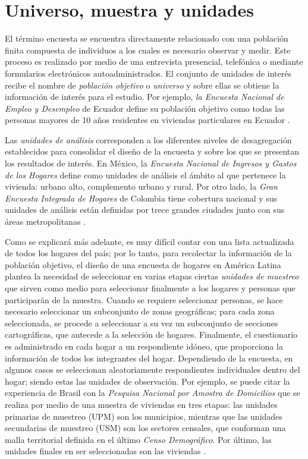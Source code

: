 \documentclass[
  12pt,
]{book}
\begin{document}
\hypertarget{universo-muestra-y-unidades}{%
\section{Universo, muestra y unidades}\label{universo-muestra-y-unidades}}

El término encuesta se encuentra directamente relacionado con una población finita compuesta de individuos a los cuales es necesario observar y medir. Este proceso es realizado por medio de una entrevista presencial, telefónica o mediante formularios electrónicos autoadministrados. El conjunto de unidades de interés recibe el nombre de \emph{población objetivo} o \emph{universo} y sobre ellas se obtiene la información de interés para el estudio. Por ejemplo, \emph{la Encuesta Nacional de Empleo y Desempleo} de Ecuador define su población objetivo como todas las personas mayores de 10 años residentes en viviendas particulares en Ecuador \citep{INEC-EC}.

Las \emph{unidades de análisis} corresponden a los diferentes niveles de desagregación establecidos para consolidar el diseño de la encuesta y sobre los que se presentan los resultados de interés. En México, la \emph{Encuesta Nacional de Ingresos y Gastos de los Hogares} define como unidades de análisis el ámbito al que pertenece la vivienda: urbano alto, complemento urbano y rural. Por otro lado, la \emph{Gran Encuesta Integrada de Hogares} de Colombia tiene cobertura nacional y sus unidades de análisis están definidas por trece grandes ciudades junto con sus áreas metropolitanas \citep{DANE-COL_2017}.

Como se explicará más adelante, es muy difícil contar con una lista actualizada de todos los hogares del país; por lo tanto, para recolectar la información de la población objetivo, el diseño de una encuesta de hogares en América Latina plantea la necesidad de seleccionar en varias etapas ciertas \emph{unidades de muestreo} que sirven como medio para seleccionar finalmente a los hogares y personas que participarán de la muestra. Cuando se requiere seleccionar personas, se hace necesario seleccionar un subconjunto de zonas geográficas; para cada zona seleccionada, se procede a seleccionar a su vez un subconjunto de secciones cartográficas, que antecede a la selección de hogares. Finalmente, el cuestionario es administrado en cada hogar a un respondiente idóneo, que proporciona la información de todos los integrantes del hogar. Dependiendo de la encuesta, en algunos casos se seleccionan aleatoriamente respondientes individuales dentro del hogar; siendo estas las unidades de observación. Por ejemplo, se puede citar la experiencia de Brasil con la \emph{Pesquisa Nacional por Amostra de Domicilios} que se realiza por medio de una muestra de viviendas en tres etapas: las unidades primarias de muestreo (UPM) son los municipios, mientras que las unidades secundarias de muestreo (USM) son los sectores censales, que conforman una malla territorial definida en el último \emph{Censo Demográfico}. Por último, las unidades finales en ser seleccionadas son las viviendas \citep{IBGE_2014}.
\end{document}
